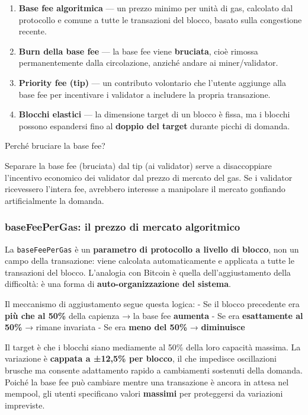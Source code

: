\documentclass[
  italian,
  openany]{book}
\providecommand{\tightlist}{%
  \setlength{\itemsep}{0pt}\setlength{\parskip}{0pt}}
\begin{document}
\begin{enumerate}
\def\labelenumi{\arabic{enumi}.}
\tightlist
\item
  \textbf{Base fee algoritmica} --- un prezzo minimo per unità di gas,
  calcolato dal protocollo e comune a tutte le transazioni del blocco,
  basato sulla congestione recente.
\item
  \textbf{Burn della base fee} --- la base fee viene \textbf{bruciata},
  cioè rimossa permanentemente dalla circolazione, anziché andare ai
  miner/validator.
\item
  \textbf{Priority fee (tip)} --- un contributo volontario che l'utente
  aggiunge alla base fee per incentivare i validator a includere la
  propria transazione.
\item
  \textbf{Blocchi elastici} --- la dimensione target di un blocco è
  fissa, ma i blocchi possono espandersi fino al \textbf{doppio del
  target} durante picchi di domanda.
\end{enumerate}

\begin{callouttip}{Perché bruciare la base fee?}

Separare la base fee (bruciata) dal tip (ai validator) serve a
disaccoppiare l'incentivo economico dei validator dal prezzo di mercato
del gas. Se i validator ricevessero l'intera fee, avrebbero interesse a
manipolare il mercato gonfiando artificialmente la domanda.

\end{callouttip}

\subsubsection{baseFeePerGas: il prezzo di mercato
algoritmico}\label{basefeepergas-il-prezzo-di-mercato-algoritmico}

La \texttt{baseFeePerGas} è un \textbf{parametro di protocollo a livello
di blocco}, non un campo della transazione: viene calcolata
automaticamente e applicata a tutte le transazioni del blocco.
L'analogia con Bitcoin è quella dell'aggiustamento della difficoltà: è
una forma di \textbf{auto-organizzazione del sistema}.

Il meccanismo di aggiustamento segue questa logica: - Se il blocco
precedente era \textbf{più che al 50\%} della capienza → la base fee
\textbf{aumenta} - Se era \textbf{esattamente al 50\%} → rimane
invariata - Se era \textbf{meno del 50\%} → \textbf{diminuisce}

Il target è che i blocchi siano mediamente al 50\% della loro capacità
massima. La variazione è \textbf{cappata a ±12,5\% per blocco}, il che
impedisce oscillazioni brusche ma consente adattamento rapido a
cambiamenti sostenuti della domanda. Poiché la base fee può cambiare
mentre una transazione è ancora in attesa nel mempool, gli utenti
specificano valori \textbf{massimi} per proteggersi da variazioni
impreviste.
\end{document}
